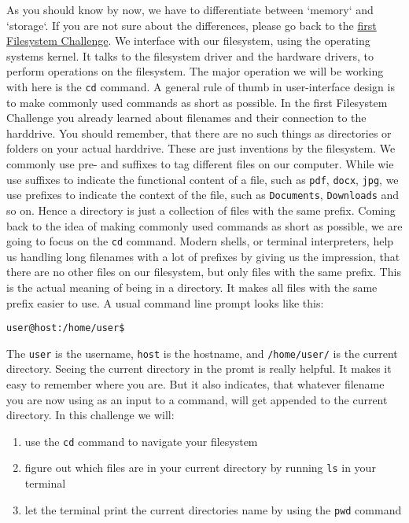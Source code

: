 \begin{challenge}
    \begin{chadescription}
    As you should know by now, we have to differentiate between `memory` and `storage`.
    If you are not sure about the differences, please go back to the \href{https://www.github.com/STEMgraph/}{first Filesystem Challenge}.
    We interface with our filesystem, using the operating systems kernel. 
    It talks to the filesystem driver and the hardware drivers, to perform operations on the filesystem.
    The major operation we will be working with here is the \texttt{cd} command.
    A general rule of thumb in user-interface design is to make commonly used commands as short as possible.
    In the first Filesystem Challenge you already learned about filenames and their connection to the harddrive. 
    You should remember, that there are no such things as directories or folders on your actual harddrive.
    These are just inventions by the filesystem. 
    We commonly use pre- and suffixes to tag different files on our computer. 
    While wie use suffixes to indicate the functional content of a file, such as \texttt{pdf}, \texttt{docx}, \texttt{jpg}, we use prefixes to indicate the context of the file, such as \texttt{Documents}, \texttt{Downloads} and so on.
    Hence a directory is just a collection of files with the same prefix.
    Coming back to the idea of making commonly used commands as short as possible, we are going to focus on the \texttt{cd} command.
    Modern shells, or terminal interpreters, help us handling long filenames with a lot of prefixes by giving us the impression, that there are no other files on our filesystem, but only files with the same prefix.
    This is the actual meaning of being in a directory.
    It makes all files with the same prefix easier to use. 
    A usual command line prompt looks like this:
    \begin{center}
    \texttt{user@host:/home/user\$}
    \end{center}
    The \texttt{user} is the username, \texttt{host} is the hostname, and \texttt{/home/user/} is the current directory.
    Seeing the current directory in the promt is really helpful. 
    It makes it easy to remember where you are.
    But it also indicates, that whatever filename you are now using as an input to a command, will get appended to the current directory.
    In this challenge we will: 
    
    
    \begin{enumerate}
        \item use the \texttt{cd} command to navigate your filesystem
        \item figure out which files are in your current directory by running \texttt{ls} in your terminal
        \item let the terminal print the current directories name by using the \texttt{pwd} command
    \end{enumerate}
    \end{chadescription}


\end{challenge}
